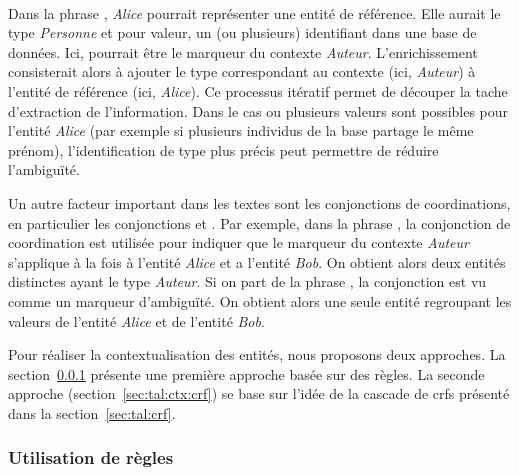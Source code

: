 \paragraph{}
Dans la phrase , \emph{Alice} pourrait représenter une entité de référence.
Elle aurait le type \emph{Personne} et pour valeur, un (ou plusieurs) identifiant dans une base de données.
Ici,  pourrait être le marqueur du contexte \emph{Auteur}.
L'enrichissement consisterait alors à ajouter le type correspondant au contexte (ici, \emph{Auteur}) à l'entité de référence (ici, \emph{Alice}).
Ce processus itératif permet de découper la tache d'extraction de l'information.
Dans le cas ou plusieurs valeurs sont possibles pour l'entité \emph{Alice} (par exemple si plusieurs individus de la base partage le même prénom), l'identification de type plus précis peut permettre de réduire l'ambiguïté.

Un autre facteur important dans les textes sont les conjonctions de coordinations, en particulier les conjonctions  et .
Par exemple, dans la phrase , la conjonction de coordination  est utilisée pour indiquer que le marqueur du contexte \emph{Auteur} s'applique à la fois à l'entité \emph{Alice} et a l'entité \emph{Bob}.
On obtient alors deux entités distinctes ayant le type \emph{Auteur}.
Si on part de la phrase , la conjonction  est vu comme un marqueur d'ambiguïté.
On obtient alors une seule entité regroupant les valeurs de l'entité \emph{Alice} et de l'entité \emph{Bob}.

Pour réaliser la contextualisation des entités, nous proposons deux approches.
La section~\ref{sec:tal:ctx:rule} présente une première approche basée sur des règles.
La seconde approche (section~\ref{sec:tal:ctx:crf}) se base sur l'idée de la cascade de \glspl{crf} présenté dans la section~\ref{sec:tal:crf}.

\subsubsection{Utilisation de règles}
\label{sec:tal:ctx:rule}

